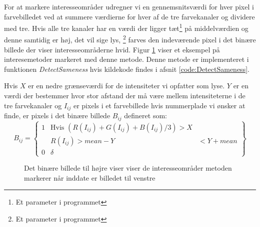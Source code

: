 For at markere interesseområder udregner vi en gennemsnitsværdi for hver pixel i farvebilledet ved at summere værdierne for hver af de tre farvekanaler og dividere med tre. Hvis alle tre kanaler har en værdi der ligger tæt\footnote{Et parameter i programmet} på middelværdien og denne samtidig er høj, det vil sige lys, \footnote{Et parameter i programmet} farves den indeværende pixel i det binære billede der viser interesseområderne hvid. Figur \ref{fig:binary_DetectSameness} viser et eksempel på interesemetoder markeret med denne metode. Denne metode er implementeret i funktionen \textit{DetectSameness} hvis kildekode findes i afsnit \vref{code:DetectSameness}. 

Hvis $X$ er en nedre grænseværdi for de intensiteter vi opfatter som lyse. $Y$ er en værdi der bestemmer hvor stor afstand der må være mellem intensiteterne i de tre farvekanaler og $I_{ij}$ er pixels i et farvebillede hvis nummerplade vi ønsker at finde, er pixels i det binære billede $B_{ij}$ defineret som:
\begin{equation}
B_{ij} = 
\begin{Bmatrix}
1 & \text{Hvis } (R(I_{ij})+G(I_{ij})+B(I_{ij})/3) > X\\
 & R(I_{ij}) > mean - Y & < Y + mean\\
0 & \delta
\end{Bmatrix}
\end{equation}

\begin{figure}[htbp]
  \centering
  \begin{minipage}[b]{5 cm}
  \end{minipage}
  \begin{minipage}[b]{5 cm}
  \end{minipage}
  \caption{Det binære billede til højre viser viser de interesseområder metoden markerer når inddate er billedet til venstre}
  \label{fig:binary_DetectSameness}
\end{figure}


